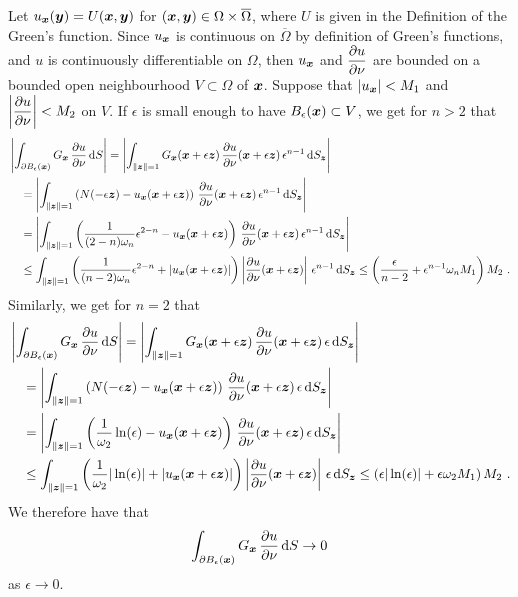 Let $u_{{\bm{x}}}({\bm{y}}) = U({\bm{x}},{\bm{y}})$ for
$({\bm{x}},{\bm{y}}) \in \Omega \times \overline{\Omega}$, where $U$ is
given in the Definition of the Green's function.
Since $u_{{\bm{x}}}$ is continuous on $\overline{\Omega}$ by definition
of Green's functions, and $u$ is continuously differentiable on
$\Omega$, then $u_{{\bm{x}}}$ and $\displaystyle \frac{\partial{u}}{\partial \nu}$
are bounded on a bounded open neighbourhood $V \subset \Omega$ of
${\bm{x}}$.  Suppose that $|u_{{\bm{x}}}| < M_1$ and
$\displaystyle \left| \frac{\partial{u}}{\partial \nu} \right| < M_2$ on $V$.
If $\epsilon$ is small enough to have $B_\epsilon({\bm{x}}) \subset V$,
we get for $n>2$ that
\begin{align*}
&\left|\int_{\partial B_{\epsilon}({\bm{x}})}
G_{{\bm{x}}}\,\frac{\partial{u}}{\partial \nu} \,\mathrm{d}{S}\right|
= \left| \int_{\|{\bm{z}}\|=1}
G_{{\bm{x}}}({\bm{x}}+\epsilon {\bm{z}})
\,\frac{\partial{u}}{\partial \nu}({\bm{x}}+\epsilon {\bm{z}})
\, \epsilon^{n-1} \,\mathrm{d}{S}_{{\bm{z}}} \right| \\
&\quad = \left| \int_{\|{\bm{z}}\|=1}
\left( N(-\epsilon{\bm{z}}) - u_{{\bm{x}}}({\bm{x}} + \epsilon {\bm{z}}) \right)
\,\frac{\partial{u}}{\partial \nu}({\bm{x}}+\epsilon {\bm{z}})
\,\epsilon^{n-1} \,\mathrm{d}{S}_{{\bm{z}}} \right| \\
&\quad = \left| \int_{\|{\bm{z}}\|=1}
\left( \frac{1}{(2-n)\omega_n} \epsilon^{2-n} -
u_{{\bm{x}}}({\bm{x}} + \epsilon {\bm{z}})  \right)
\,\frac{\partial{u}}{\partial \nu}({\bm{x}} + \epsilon {\bm{z}})
\, \epsilon^{n-1} \,\mathrm{d}{S}_{{\bm{z}}} \right| \\
&\quad \leq \int_{\|{\bm{z}}\|=1}
\left( \frac{1}{(n-2)\omega_n} \epsilon^{2-n} +
\left| u_{{\bm{x}}}({\bm{x}} + \epsilon {\bm{z}}) \right| \right)
\left| \frac{\partial{u}}{\partial \nu}({\bm{x}} + \epsilon {\bm{z}})
\right|\, \epsilon^{n-1} \,\mathrm{d}{S}_{{\bm{z}}} \leq \left(\frac{\epsilon}{n-2} +
\epsilon^{n-1} \omega_n M_1\right) M_2 \ . 
\end{align*}
Similarly, we get for $n=2$ that
\begin{align*}
&\left|\int_{\partial B_{\epsilon}({\bm{x}})}
G_{{\bm{x}}}\,\frac{\partial{u}}{\partial \nu} \,\mathrm{d}{S}\right|
=\left| \int_{\|{\bm{z}}\|=1}
G_{{\bm{x}}}({\bm{x}}+\epsilon {\bm{z}})
\,\frac{\partial{u}}{\partial \nu}({\bm{x}}+\epsilon {\bm{z}})
\, \epsilon \,\mathrm{d}{S}_{{\bm{z}}} \right| \\
&\quad = \left| \int_{\|{\bm{z}}\|=1}
\left( N(-\epsilon{\bm{z}}) - u_{{\bm{x}}}({\bm{x}} + \epsilon {\bm{z}}) \right)
\,\frac{\partial{u}}{\partial \nu}({\bm{x}}+\epsilon {\bm{z}})
\, \epsilon \,\mathrm{d}{S}_{{\bm{z}}} \right| \\
&\quad = \left| \int_{\|{\bm{z}}\|=1}
\left( \frac{1}{\omega_2} \ln(\epsilon) -
u_{{\bm{x}}}({\bm{x}} + \epsilon {\bm{z}}) \right)
\,\frac{\partial{u}}{\partial \nu}({\bm{x}} + \epsilon {\bm{z}})
\, \epsilon \,\mathrm{d}{S}_{{\bm{z}}} \right| \\
&\quad \leq \int_{\|{\bm{z}}\|=1}
\left( \frac{1}{\omega_2} |\ln(\epsilon)|  +
\left| u_{{\bm{x}}}({\bm{x}} + \epsilon {\bm{z}}) \right| \right)
\left| \frac{\partial{u}}{\partial \nu}({\bm{x}} + \epsilon {\bm{z}})
\right|\, \epsilon \,\mathrm{d}{S}_{{\bm{z}}}
\leq \left( \epsilon |\ln(\epsilon)| + \epsilon \omega_2 M_1 \right) M_2 \ . 
\end{align*}
We therefore have that
\[
\int_{\partial B_{\epsilon}({\bm{x}})}
G_{{\bm{x}}}\,\frac{\partial{u}}{\partial \nu} \,\mathrm{d}{S} \to 0
\]
as $\epsilon \to 0$.

